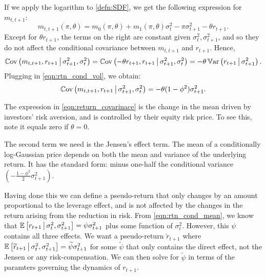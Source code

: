 \documentclass[11pt, letterpaper, twoside, final]{article}
\begin{document}
If we apply the logarithm to \cref{defn:SDF}, we get the following expression for $m_{t,t+1}$:
%
 \begin{equation}
  \label{eqn:log_sdf}
    m_{t,t+1}(\pi, \theta) = m_{0}(\pi, \theta) + m_1(\pi, \theta) \sigma_t^2 - \pi \sigma^2_{t+1} - \theta
    r_{t+1}.
\end{equation}
%
Except for $\theta r_{t+1}$, the terms on the right are constant given $\sigma^2_t, \sigma^2_{t+1}$, and so they do not affect the conditional covariance between $m_{t,t+1}$ and $r_{t+1}$.  Hence,
%
\begin{equation}
  \Cov\left(m_{t,t+1}, r_{t+1} \mvert \sigma^2_{t+1}, \sigma^2_t \right)  
%
  = \Cov\left(-\theta r_{t+1}, r_{t+1} \mvert \sigma^2_{t+1}, \sigma^2_t \right)  
%
  = -\theta \Var\left(r_{t+1} \mvert \sigma^2_{t+1}\right).  
\end{equation}
%
Plugging in \cref{eqn:rtn_cond_vol}, we obtain:
%
\begin{equation}
  \label{eqn:return_covarinace}
  \Cov\left(m_{t,t+1}, r_{t+1} \mvert \sigma^2_{t+1}, \sigma^2_t \right)  
%
  = -\theta (1 - \phi^2) \sigma^2_{t+1}.
\end{equation}

The expression in \cref{eqn:return_covarinace} is the change in the mean driven by investors' risk aversion, and is controlled by their equity risk price. To see this, note it equals zero if $\theta = 0$.

The second term we need is the Jensen's effect term. The mean of a conditionally log-Gaussian price depends on both the mean and variance of the underlying return. It has the standard form: minus one-half the conditional variance $\left(-\frac{1 - \phi^2}{2} \sigma^2_{t+1}\right)$. 

Having done this we can define a pseudo-return that only changes by an amount proportional to the leverage effect, and is not affected by the changes in the return arising from the reduction in risk. From \cref{eqn:rtn_cond_mean}, we know that $\operatorname{\mathbb{E}}\left[r_{t+1} \,\middle\vert\, \sigma^2_t, \sigma^2_{t+1} \right] = \psi \sigma^2_{t+1}$ plus some function of $\sigma^2_t$. However, this $\psi$ contains all three effects. We want a pseudo-return $\widetilde{r}_{t+1}$ where $\operatorname{\mathbb{E}}\left[\widetilde{r}_{t+1} \,\middle\vert\, \sigma^2_t, \sigma^2_{t+1} \right] = \widetilde{\psi} \sigma^2_{t+1}$ for some $\widetilde{\psi}$ that only contains the direct effect, not the Jensen or any risk-compensation. We can then solve for $\widetilde{\psi}$ in terms of the paramters governing the dynamics of $r_{t+1}$.
\end{document}
